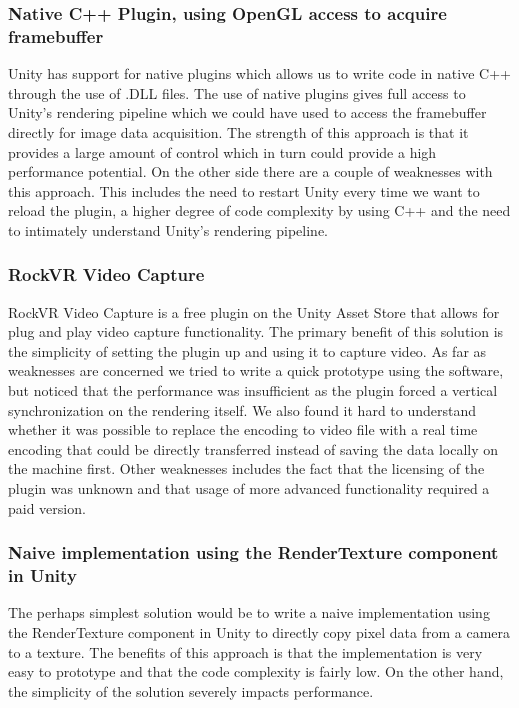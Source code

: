 \subsubsection{Native C++ Plugin, using OpenGL access to acquire framebuffer}
Unity has support for native plugins\cite{unity_native_plugin} which allows us to write code in native C++ through the use of .DLL files. The use of native plugins gives full access to Unity's rendering pipeline which we could have used to access the framebuffer directly for image data acquisition. The strength of this approach is that it provides a large amount of control which in turn could provide a high performance potential. On the other side there are a couple of weaknesses with this approach. This includes the need to restart Unity every time we want to reload the plugin, a higher degree of code complexity by using C++ and the need to intimately understand Unity's rendering pipeline.  

\subsubsection{RockVR Video Capture}
RockVR Video Capture\cite{unity_asset_store_rockvr} is a free plugin on the Unity Asset Store that allows for plug and play video capture functionality. The primary benefit of this solution is the simplicity of setting the plugin up and using it to capture video. As far as weaknesses are concerned we tried to write a quick prototype using the software, but noticed that the performance was insufficient as the plugin forced a vertical synchronization on the rendering itself. We also found it hard to understand whether it was possible to replace the encoding to video file with a real time encoding that could be directly transferred instead of saving the data locally on the machine first. Other weaknesses includes the fact that the licensing of the plugin was unknown and that usage of more advanced functionality required a paid version. 

\subsubsection{Naive implementation using the RenderTexture component in Unity}
The perhaps simplest solution would be to write a naive implementation using the RenderTexture\cite{unity_renderTexture} component in Unity to directly copy pixel data from a camera to a texture. The benefits of this approach is that the implementation is very easy to prototype and that the code complexity is fairly low. On the other hand, the simplicity of the solution severely impacts performance.  

